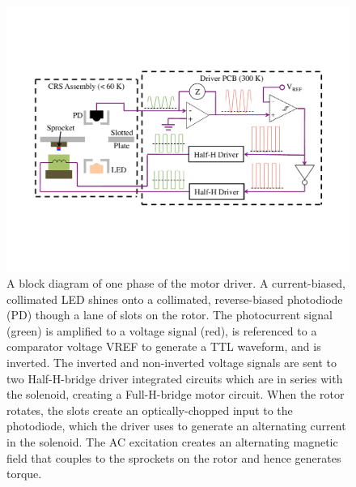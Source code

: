\begin{figure}[ht!]
    \centering
    \includegraphics[width=0.98\linewidth]{CHWPDesign/Figures/MotorDiagram.pdf}
    \caption[A block diagram of one phase of the motor driver]{A block diagram of one phase of the motor driver. A current-biased, collimated LED shines onto a collimated, reverse-biased photodiode (PD) though a lane of slots on the rotor. The photocurrent signal (green) is amplified to a voltage signal (red), is referenced to a comparator voltage VREF to generate a TTL waveform, and is inverted. The inverted and non-inverted voltage signals are sent to two Half-H-bridge driver integrated circuits which are in series with the solenoid, creating a Full-H-bridge motor circuit. When the rotor rotates, the slots create an optically-chopped input to the photodiode, which the driver uses to generate an alternating current in the solenoid. The AC excitation creates an alternating magnetic field that couples to the sprockets on the rotor and hence generates torque.}
    \label{fig:chwp_motor_diagram}
\end{figure}


